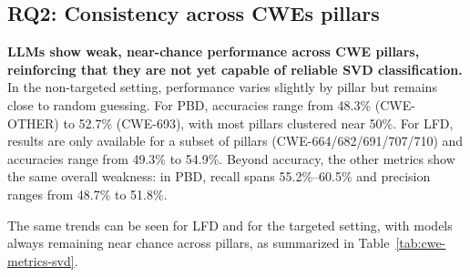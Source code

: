 \documentclass[lettersize,journal]{IEEEtran}
\begin{document}
\subsection{RQ2: Consistency across CWEs pillars}
\label{section:rq2}

\textbf{\glspl{LLM} show weak, near-chance performance across CWE pillars, reinforcing that they are not yet capable of reliable \gls{SVD} classification.}
In the non-targeted setting, performance varies slightly by pillar but remains close to random guessing. For \gls{PBD}, accuracies range from 48.3\% (CWE-OTHER) to 52.7\% (CWE-693), with most pillars clustered near 50\%. For \gls{LFD}, results are only available for a subset of pillars (CWE-664/682/691/707/710) and accuracies range from 49.3\% to 54.9\%. Beyond accuracy, the other metrics show the same overall weakness: in \gls{PBD}, recall spans 55.2\%--60.5\% and precision ranges from 48.7\% to 51.8\%. 

The same trends can be seen for \gls{LFD} and for the targeted setting, with models always remaining near chance across pillars, as summarized in Table~\ref{tab:cwe-metrics-svd}.
\end{document}
